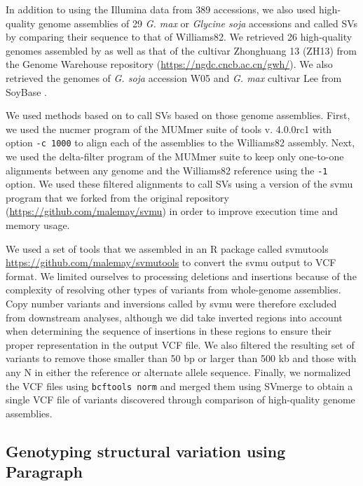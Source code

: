 \documentclass[12pt]{article}
\begin{document}
In addition to using the Illumina data from 389 accessions, we also used
high-quality genome assemblies of 29 \emph{G. max} or \emph{Glycine soja}
accessions and called SVs by comparing their sequence to that of Williams82. We
retrieved 26 high-quality genomes assembled by \cite{liu2020-pangenome} as well
as that of the cultivar Zhonghuang 13 (ZH13) from the Genome Warehouse
repository (\url{https://ngdc.cncb.ac.cn/gwh/}).  We also retrieved the genomes
of \emph{G. soja} accession W05 and \emph{G. max} cultivar Lee from SoyBase
\citep{grant2010}.

We used methods based on \cite{liu2020-pangenome} to call SVs based on those
genome assemblies.  First, we used the nucmer program of the MUMmer suite of
tools v. 4.0.0rc1 \citep{marcais2018} with option \texttt{-c 1000} to align
each of the assemblies to the Williams82 assembly. Next, we used the
delta-filter program of the MUMmer suite to keep only one-to-one alignments
between any genome and the Williams82 reference using the \texttt{-1} option.
We used these filtered alignments to call SVs using a version of the svmu
program \citep{chakraborty2019} that we forked from the original repository
(\url{https://github.com/malemay/svmu}) in order to improve execution time and
memory usage.

We used a set of tools that we assembled in an R package called svmutools
\url{https://github.com/malemay/svmutools} to convert the svmu output to VCF
format. We limited ourselves to processing deletions and insertions because of
the complexity of resolving other types of variants from whole-genome
assemblies.  Copy number variants and inversions called by svmu were therefore
excluded from downstream analyses, although we did take inverted regions into
account when determining the sequence of insertions in these regions to ensure
their proper representation in the output VCF file. We also filtered the
resulting set of variants to remove those smaller than 50 bp or larger than 500
kb and those with any N in either the reference or alternate allele sequence.
Finally, we normalized the VCF files using \texttt{bcftools norm} and merged
them using SVmerge to obtain a single VCF file of variants discovered through
comparison of high-quality genome assemblies.

\subsection{Genotyping structural variation using Paragraph}
\label{sv-gwas-sv-genotyping-paragraph}
\end{document}
